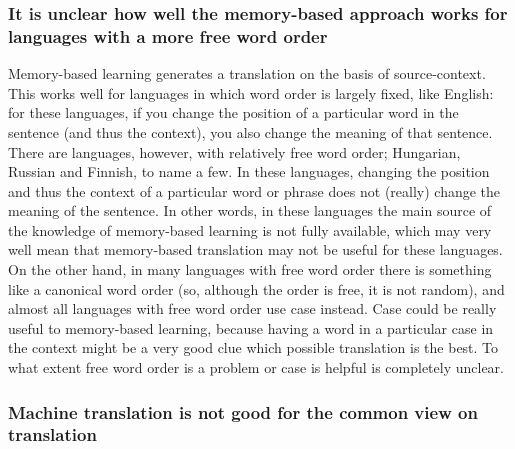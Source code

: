 \documentclass[12pt]{article}
\begin{document}
\subsubsection{It is unclear how well the memory-based approach works for languages with a more free word order}

Memory-based learning generates a translation on the basis of source-context. This works well for languages in which word order is largely fixed, like English: for these languages, if you change the position of a particular word in the sentence (and thus the context), you also change the meaning of that sentence. There are languages, however, with relatively free word order; Hungarian, Russian and Finnish, to name a few. In these languages, changing the position and thus the context of a particular word or phrase does not (really) change the meaning of the sentence. In other words, in these languages the main source of the knowledge of memory-based learning is not fully available, which may very well mean that memory-based translation may not be useful for these languages. On the other hand, in many languages with free word order there is something like a canonical word order (so, although the order is free, it is not random), and almost all languages with free word order use case instead. Case could be really useful to memory-based learning, because having a word in a particular case in the context might be a very good clue which possible translation is the best. To what extent free word order is a problem or case is helpful is completely unclear.
\\\indent

\subsubsection{Machine translation is not good for the common view on translation}
\end{document}
